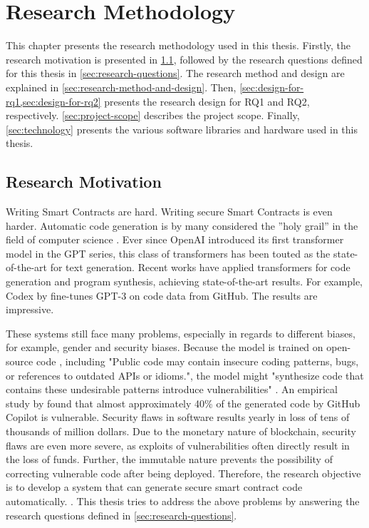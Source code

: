\chapter{Research Methodology}
\label{chap:research-methodoloy}
This chapter presents the research methodology used in this thesis. Firstly, the research motivation is presented in \cref{sec:research-motivation}, followed by the research questions defined for this thesis in \cref{sec:research-questions}. The research method and design are explained in \cref{sec:research-method-and-design}. Then, \cref{sec:design-for-rq1,sec:design-for-rq2} presents the research design for RQ1 and RQ2, respectively. \cref{sec:project-scope} describes the project scope. Finally, \cref{sec:technology} presents the various software libraries and hardware used in this thesis.

\section{Research Motivation}
\label{sec:research-motivation}
Writing Smart Contracts are hard. Writing secure Smart Contracts is even harder. Automatic code generation is by many considered the ”holy grail” in the field of computer science \cite{PGL-010}. Ever since OpenAI introduced its first transformer model in the GPT series, this class of transformers has been touted as the state-of-the-art for text generation. Recent works have applied transformers for code generation and program synthesis, achieving state-of-the-art results. For example, Codex by \textcite{chen2021codex} fine-tunes GPT-3 \cite{brown2020language} on code data from GitHub. The results are impressive. 

These systems still face many problems, especially in regards to different biases, for example, gender and security biases. Because the model is trained on open-source code \cite{chen2021codex}, including "Public code may contain insecure coding patterns, bugs, or references to outdated APIs or idioms.", the model might "synthesize code that contains these undesirable patterns introduce vulnerabilities" \cite{copilot}. An empirical study by \textcite{pearce2021asleep} found that almost approximately 40\% of the generated code by GitHub Copilot is vulnerable. Security flaws in software results yearly in loss of tens of thousands of million dollars. Due to the monetary nature of blockchain, security flaws are even more severe, as exploits of vulnerabilities often directly result in the loss of funds.  Further, the immutable nature prevents the possibility of correcting vulnerable code after being deployed. Therefore, the research objective is to develop a system that can generate secure smart contract code automatically. . This thesis tries to address the above problems by answering the research questions defined in \cref{sec:research-questions}.


